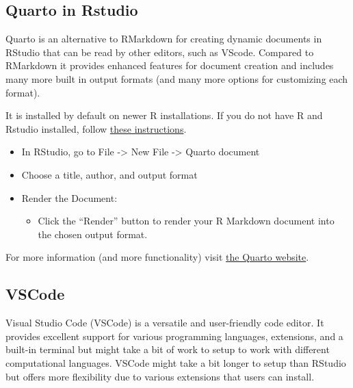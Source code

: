 \documentclass[
  letterpaper,
  DIV=11,
  numbers=noendperiod]{scrreprt}
\providecommand{\tightlist}{%
  \setlength{\itemsep}{0pt}\setlength{\parskip}{0pt}}\usepackage{longtable,booktabs,array}
\begin{document}
\subsection{Quarto in Rstudio}\label{quarto-in-rstudio}

Quarto is an alternative to RMarkdown for creating dynamic documents in
RStudio that can be read by other editors, such as VScode. Compared to
RMarkdown it provides enhanced features for document creation and
includes many more built in output formats (and many more options for
customizing each format).

It is installed by default on newer R installations. If you do not have
R and Rstudio installed, follow
\href{https://rstudio-education.github.io/hopr/starting.html}{these
instructions}.

\begin{itemize}
\tightlist
\item
  In RStudio, go to File -\textgreater{} New File -\textgreater{} Quarto
  document
\item
  Choose a title, author, and output format
\item
  Render the Document:

  \begin{itemize}
  \tightlist
  \item
    Click the ``Render'' button to render your R Markdown document into
    the chosen output format.
  \end{itemize}
\end{itemize}

For more information (and more functionality) visit
\href{https://quarto.org/docs/get-started/hello/rstudio.html}{the Quarto
website}.

\subsection{VSCode}\label{vscode}

Visual Studio Code (VSCode) is a versatile and user-friendly code
editor. It provides excellent support for various programming languages,
extensions, and a built-in terminal but might take a bit of work to
setup to work with different computational languages. VSCode might take
a bit longer to setup than RStudio but offers more flexibility due to
various extensions that users can install.
\end{document}

